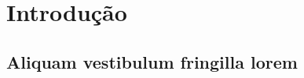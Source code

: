 
\chapter[Introdução]{Introdução}

\lipsum[2-3]

\section{Aliquam vestibulum fringilla lorem}

\lipsum[1]

\lipsum[2-3]

